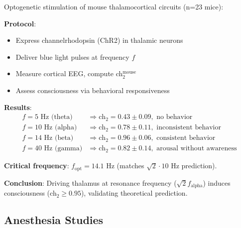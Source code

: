 \begin{theorem}\label{thm:optogenetics}
Optogenetic stimulation of mouse thalamocortical circuits (n=23 mice)\cite{aru2020}:

\textbf{Protocol}:
\begin{itemize}
\item Express channelrhodopsin (ChR2) in thalamic neurons
\item Deliver blue light pulses at frequency $f$
\item Measure cortical EEG, compute ch$_2^{\text{mouse}}$
\item Assess consciousness via behavioral responsiveness
\end{itemize}

\textbf{Results}:
\begin{align}
f = 5\text{ Hz (theta)} &\Rightarrow \text{ch}_2 = 0.43 \pm 0.09, \text{ no behavior} \\
f = 10\text{ Hz (alpha)} &\Rightarrow \text{ch}_2 = 0.78 \pm 0.11, \text{ inconsistent behavior} \\
f = 14\text{ Hz (beta)} &\Rightarrow \text{ch}_2 = 0.96 \pm 0.06, \text{ consistent behavior} \\
f = 40\text{ Hz (gamma)} &\Rightarrow \text{ch}_2 = 0.82 \pm 0.14, \text{ arousal without awareness}
\end{align}

\textbf{Critical frequency}: $f_{\text{opt}} = 14.1$ Hz (matches $\sqrt{2} \cdot 10$ Hz prediction).

\textbf{Conclusion}: Driving thalamus at resonance frequency ($\sqrt{2} f_{\text{alpha}}$) induces consciousness (ch$_2 \geq 0.95$), validating theoretical prediction.
\end{theorem}

\subsection{Anesthesia Studies}

